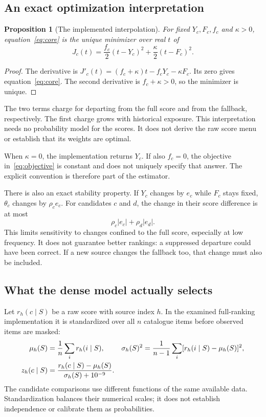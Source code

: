 \documentclass[11pt,a4paper]{article}
\newtheorem{proposition}{Proposition}
\begin{document}
\subsection{An exact optimization interpretation}

\begin{proposition}[The implemented interpolation]
For fixed $Y_c,F_c,f_c$ and $\kappa>0$, equation~\eqref{eq:core} is the
unique minimizer over real $t$ of
\begin{equation}
 J_c(t)=\frac{f_c}{2}(t-Y_c)^2+\frac{\kappa}{2}(t-F_c)^2.
 \label{eq:objective}
\end{equation}
\end{proposition}
\begin{proof}
The derivative is
$J'_c(t)=(f_c+\kappa)t-f_cY_c-\kappa F_c$.
Its zero gives equation~\eqref{eq:core}. The second derivative is
$f_c+\kappa>0$, so the minimizer is unique.
\end{proof}

The two terms charge for departing from the full score and from the fallback,
respectively. The first charge grows with historical exposure. This
interpretation needs no probability model for the scores. It does not derive
the raw score menu or establish that its weights are optimal.

When $\kappa=0$, the implementation returns $Y_c$. If also $f_c=0$, the
objective in~\eqref{eq:objective} is constant and does not uniquely specify
that answer. The explicit convention is therefore part of the estimator.

There is also an exact stability property. If $Y_c$ changes by $e_c$ while
$F_c$ stays fixed, $\theta_c$ changes by $\rho_c e_c$. For candidates
$c$ and $d$, the change in their score difference is at most
\begin{equation}
 \rho_c|e_c|+\rho_d|e_d|.
\end{equation}
This limits sensitivity to changes confined to the full score, especially
at low frequency. It does not guarantee better rankings: a suppressed
departure could have been correct. If a new source changes the fallback too,
that change must also be included.

\subsection{What the dense model actually selects}

Let $r_h(c\mid S)$ be a raw score with source index $h$. In the examined
full-ranking implementation it is standardized over all $n$ catalogue items
before observed items are masked:
\begin{align}
 \mu_h(S)&=\frac1n\sum_i r_h(i\mid S), &
 \sigma_h(S)^2&=\frac1{n-1}\sum_i[r_h(i\mid S)-\mu_h(S)]^2,\notag\\
 z_h(c\mid S)&=\frac{r_h(c\mid S)-\mu_h(S)}{\sigma_h(S)+10^{-9}}.
 \label{eq:standardize}
\end{align}
The candidate comparisons use different functions of the same available
data. Standardization balances their numerical scales; it does not establish
independence or calibrate them as probabilities.
\end{document}
